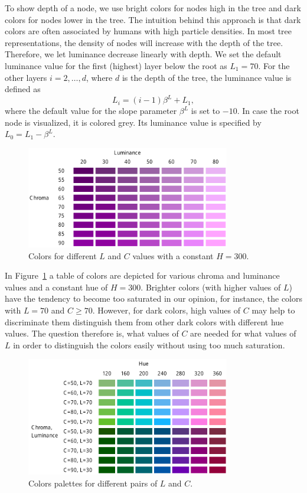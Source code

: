 \documentclass[journal]{vgtc}                %
\begin{document}
To show depth of a node, we use bright colors for nodes high in the tree and dark colors for nodes lower in the tree. The intuition behind this approach is that dark colors are often associated by humans with high particle densities. In most tree representations, the density of nodes will increase with the depth of the tree. Therefore, we let luminance decrease linearly with depth.  We set the default luminance value for the first (highest) layer below the root as $L_1=70$. For the other layers $i=2,\ldots, d$, where $d$ is the depth of the tree, the luminance value is defined as
\begin{equation}
L_i=(i-1)\beta^L + L_1,
\end{equation}
where the default value for the slope parameter $\beta^L$ is set to $-10$. In case the root node is visualized, it is colored grey. Its luminance value is specified by $L_0=L_1-\beta^L$.

\begin{figure}[tb]
  \centering
  \includegraphics[width=3.5in]{LC.pdf}
  \caption{Colors for different $L$ and $C$ values with a constant $H=300$.}\label{fig:lc}
\end{figure}

In Figure~\ref{fig:lc} a table of colors are depicted for various chroma and luminance values and a constant hue of $H=300$. Brighter colors (with higher values of $L$) have the tendency to become too saturated in our opinion, for instance, the colors with $L=70$ and $C\geq70$. However, for dark colors, high values of $C$ may help to discriminate them distinguish them from other dark colors with different hue values. The question therefore is, what values of $C$ are needed for what values of $L$ in order to distinguish the colors easily without using too much saturation.


\begin{figure}[tb]
  \centering
  \includegraphics[width=3.5in]{LC2.pdf}
  \caption{Colors palettes for different pairs of $L$ and $C$.}\label{fig:lc2}
\end{figure}
\end{document}
